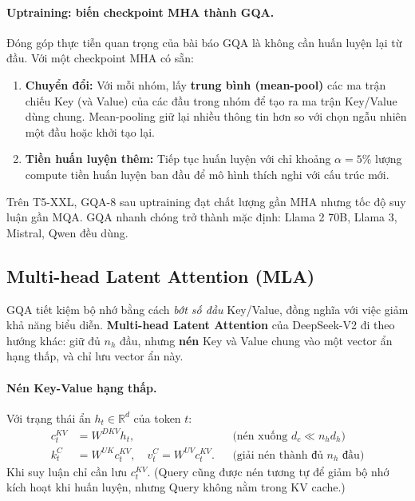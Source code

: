 \begin{center}
\label{fig:mha_gqa_mqa}
\end{center}

\paragraph{Uptraining: biến checkpoint MHA thành GQA.} Đóng góp thực tiễn quan trọng của bài báo GQA là không cần huấn luyện lại từ đầu. Với một checkpoint MHA có sẵn:
\begin{enumerate}
	\item \textbf{Chuyển đổi:} Với mỗi nhóm, lấy \textbf{trung bình (mean-pool)} các ma trận chiếu Key (và Value) của các đầu trong nhóm để tạo ra ma trận Key/Value dùng chung. Mean-pooling giữ lại nhiều thông tin hơn so với chọn ngẫu nhiên một đầu hoặc khởi tạo lại.
	\item \textbf{Tiền huấn luyện thêm:} Tiếp tục huấn luyện với chỉ khoảng $\alpha = 5\%$ lượng compute tiền huấn luyện ban đầu để mô hình thích nghi với cấu trúc mới.
\end{enumerate}
Trên T5-XXL, GQA-8 sau uptraining đạt chất lượng gần MHA nhưng tốc độ suy luận gần MQA. GQA nhanh chóng trở thành mặc định: Llama 2 70B, Llama 3, Mistral, Qwen đều dùng.

\subsection{Multi-head Latent Attention (MLA)}
\label{ssec:mla}

GQA tiết kiệm bộ nhớ bằng cách \emph{bớt số đầu} Key/Value, đồng nghĩa với việc giảm khả năng biểu diễn. \textbf{Multi-head Latent Attention} của DeepSeek-V2 \cite{deepseekai2024v2} đi theo hướng khác: giữ đủ $n_h$ đầu, nhưng \textbf{nén} Key và Value chung vào một vector ẩn hạng thấp, và chỉ lưu vector ẩn này.

\paragraph{Nén Key-Value hạng thấp.} Với trạng thái ẩn $h_t \in \mathbb{R}^{d}$ của token $t$:
\begin{align*}
c_t^{KV} &= W^{DKV} h_t, &&\text{(nén xuống } d_c \ll n_h d_h\text{)}\\
k_t^{C} &= W^{UK} c_t^{KV}, \quad v_t^{C} = W^{UV} c_t^{KV}. &&\text{(giải nén thành đủ } n_h \text{ đầu)}
\end{align*}
Khi suy luận chỉ cần lưu $c_t^{KV}$. (Query cũng được nén tương tự để giảm bộ nhớ kích hoạt khi huấn luyện, nhưng Query không nằm trong KV cache.)

